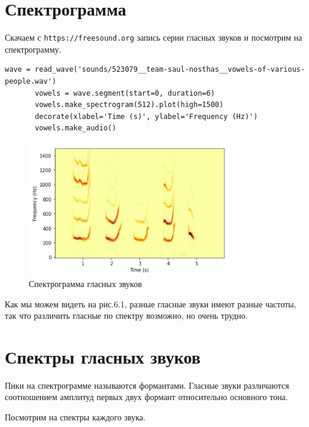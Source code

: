 \documentclass[a4paper,12pt]{report}
\begin{document}
\section{Спектрограмма}
    Скачаем с \texttt{https://freesound.org} запись серии гласных звуков и посмотрим на спектрограмму.
\begin{lstlisting}[caption=Получение спектрограммы гласных звуков]
       wave = read_wave('sounds/523079__team-saul-nosthas__vowels-of-various-people.wav')
       vowels = wave.segment(start=0, duration=6)
       vowels.make_spectrogram(512).plot(high=1500)
       decorate(xlabel='Time (s)', ylabel='Frequency (Hz)')
       vowels.make_audio()
\end{lstlisting}
\begin{figure}[H]
        \centering
        \includegraphics[width=0.8\textwidth]{fig6-1.PNG}
        \caption{Спектрограмма гласных звуков}
        \label{fig:fig6-1}
\end{figure}

    Как мы можем видеть на рис.6.1, разные гласные звуки имеют разные частоты, так что различить гласные по спектру возможно, но очень трудно.
\section{Спектры гласных звуков}
    Пики на спектрограмме называются формантами. Гласные звуки различаются соотношением амплитуд первых двух формант относительно основного тона.

    Посмотрим на спектры каждого звука.
\end{document}
